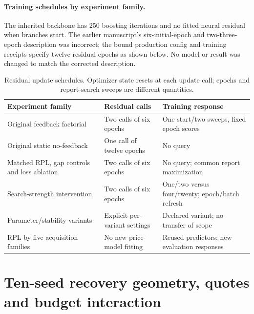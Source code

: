 \documentclass[11pt]{article}
\begin{document}
\paragraph{Training schedules by experiment family.}
The inherited backbone has 250 boosting iterations and no fitted neural
residual when branches start. The earlier manuscript's six-initial-epoch and
two-three-epoch description was incorrect; the bound production config and
training receipts specify twelve residual epochs as shown below. No model or
result was changed to match the corrected description.
\begin{table}[htbp]\centering\small
\caption{Residual update schedules. Optimizer state resets at each update call; epochs and report-search sweeps are different quantities.}
\begin{tabular}{p{.32\linewidth}p{.28\linewidth}p{.28\linewidth}}\toprule
Experiment family & Residual calls & Training response\\\midrule
Original feedback factorial & Two calls of six epochs & One start/two sweeps, fixed epoch scores\\
Original static no-feedback & One call of twelve epochs & No query\\
Matched RPL, gap controls and loss ablation & Two calls of six epochs & No query; common report maximization\\
Search-strength intervention & Two calls of six epochs & One/two versus four/twenty; epoch/batch refresh\\
Parameter/stability variants & Explicit per-variant settings & Declared variant; no transfer of scope\\
RPL by five acquisition families & No new price-model fitting & Reused predictors; new evaluation responses\\
\bottomrule\end{tabular}\end{table}
\section{Ten-seed recovery geometry, quotes and budget interaction}
\end{document}
